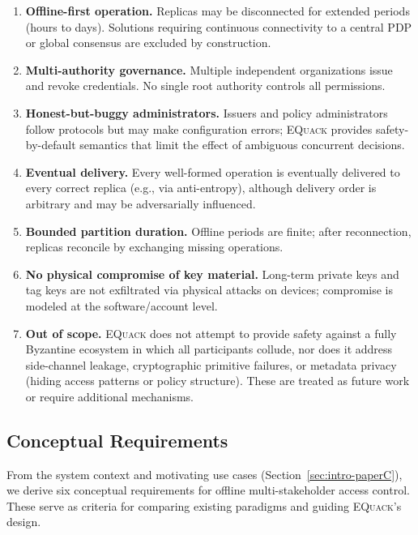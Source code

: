 \documentclass[10pt,journal,compsoc]{IEEEtran}
\newcommand{\equack}{\textsc{EQuack}}
\begin{document}
\begin{enumerate}
    \item \textbf{Offline-first operation.} Replicas may be disconnected for extended periods (hours to days). Solutions requiring continuous connectivity to a central PDP or global consensus are excluded by construction.
    \item \textbf{Multi-authority governance.} Multiple independent organizations issue and revoke credentials. No single root authority controls all permissions.
    \item \textbf{Honest-but-buggy administrators.} Issuers and policy administrators follow protocols but may make configuration errors; \equack{} provides safety-by-default semantics that limit the effect of ambiguous concurrent decisions.
    \item \textbf{Eventual delivery.} Every well-formed operation is eventually delivered to every correct replica (e.g., via anti-entropy), although delivery order is arbitrary and may be adversarially influenced.
    \item \textbf{Bounded partition duration.} Offline periods are finite; after reconnection, replicas reconcile by exchanging missing operations.
    \item \textbf{No physical compromise of key material.} Long-term private keys and tag keys are not exfiltrated via physical attacks on devices; compromise is modeled at the software/account level.
    \item \textbf{Out of scope.} \equack{} does not attempt to provide safety against a fully Byzantine ecosystem in which all participants collude, nor does it address side-channel leakage, cryptographic primitive failures, or metadata privacy (hiding access patterns or policy structure). These are treated as future work or require additional mechanisms.
\end{enumerate}

\subsection{Conceptual Requirements}\label{subsec:requirements-paperC}

From the system context and motivating use cases (Section~\ref{sec:intro-paperC}), we derive six conceptual requirements for offline multi-stakeholder access control. These serve as criteria for comparing existing paradigms and guiding \equack{}'s design.
\end{document}
